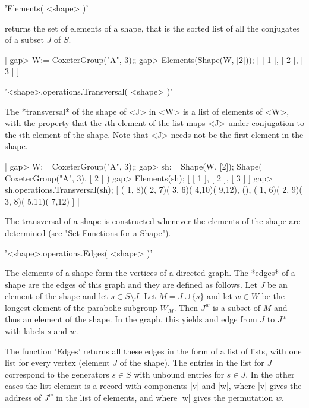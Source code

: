 'Elements( <shape> )'

returns the set  of elements of a  shape, that is the sorted  list of all
the conjugates of a subset $J$ of $S$.

|    gap> W:= CoxeterGroup("A", 3);;
    gap> Elements(Shape(W, [2]));
    [ [ 1 ], [ 2 ], [ 3 ] ] |


'<shape>.operations.Transversal( <shape> )'

The *transversal*  of the shape of  <J> in <W>  is a list of  elements of
<W>, with the property that the  $i$th element of the list maps <J> under
conjugation to the  $i$th element of the shape.  Note  that <J> needs not
be the first element in the shape.

|    gap> W:= CoxeterGroup("A", 3);;
    gap> sh:= Shape(W, [2]);   
    Shape( CoxeterGroup("A", 3), [ 2 ] )
    gap> Elements(sh);
    [ [ 1 ], [ 2 ], [ 3 ] ]
    gap> sh.operations.Transversal(sh);
    [ ( 1, 8)( 2, 7)( 3, 6)( 4,10)( 9,12), (), 
      ( 1, 6)( 2, 9)( 3, 8)( 5,11)( 7,12) ] |
      
The transversal  of a shape is  constructed whenever the  elements of the
shape are determined (see "Set Functions for a Shape").


'<shape>.operations.Edges( <shape> )'

The  elements of  a shape  form the  vertices of  a directed  graph.  The
*edges* of a  shape are the edges  of this graph and they  are defined as
follows.  Let $J$ be  an element of the shape and let  $s \in S \setminus
J$.  Let $M =  J \cup \{s\}$ and let $w \in W$  be the longest element of
the parabolic subgroup $W_M$.  Then $J^w$  is a subset of $M$ and thus an
element of  the shape.  In  the graph, this  yields and edge from  $J$ to
$J^w$ with labels $s$ and $w$.  

The function  'Edges' returns all  these edges in  the form of a  list of
lists, with  one list for every  vertex (element $J$ of  the shape).  The
entries in the  list for $J$ correspond to the generators  $s \in S$ with
unbound entries for $s \in J$.  In  the other cases the list element is a
record with components |v| and |w|,  where |v| gives the address of $J^w$
in the list of elements, and where |w| gives the permutation $w$.

